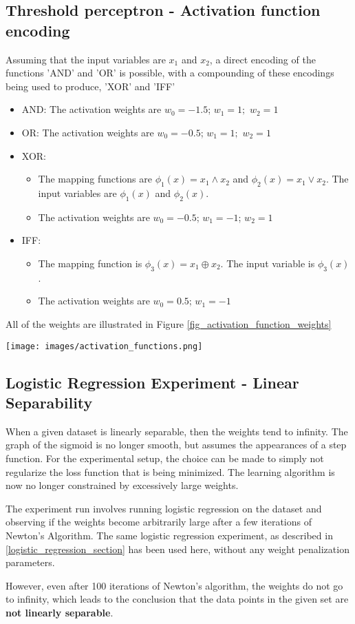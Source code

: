 \documentclass[a4paper]{article}
\begin{document}
\subsection{Threshold perceptron - Activation function encoding}
Assuming that the input variables are $x_1$ and $x_2$, a direct encoding of the functions 'AND' and 'OR' is possible, with a compounding of these encodings being used to produce, 'XOR' and 'IFF'
\begin{itemize}
	\item AND: The activation weights are $w_0 = -1.5$; $w_1 = 1;$ $w_2 = 1$
	\item OR: The activation weights are $w_0 = -0.5$; $w_1 = 1;$ $w_2 = 1$
	\item XOR: 
		\begin{itemize}
			\item The mapping functions are $\phi_1(x) = x_1 \land x_2$ and $\phi_2(x) = x_1 \lor x_2$. The input variables are $\phi_1(x)$ and $\phi_2(x)$.
			\item The activation weights are $w_0 = -0.5$; $w_1 = -1$; $w_2 = 1$
		\end{itemize}
	\item IFF: 
		\begin{itemize}
			\item The mapping function is $\phi_3(x) = x_1 \oplus x_2$. The input variable is $\phi_3(x)$.
			\item The activation weights are $w_0 = 0.5$; $w_1 = -1$
		\end{itemize}
\end{itemize}
All of the weights are illustrated in Figure \ref{fig_activation_function_weights}

\begin{figure*}[h]
    \centering
    \texttt{[image: images/activation\_functions.png]}
    \caption{Activation Function Weights}
    \label{fig_activation_function_weights}
\end{figure*}

\newpage

\subsection{Logistic Regression Experiment - Linear Separability}
When a given dataset is linearly separable, then the weights tend to infinity. The graph of the sigmoid is no longer smooth, but assumes the appearances of a step function.
For the experimental setup, the choice can be made to simply not regularize the loss function that is being minimized. The learning algorithm is now no longer constrained by excessively large weights. 

The experiment run involves running logistic regression on the dataset and observing if the weights become arbitrarily large after a few iterations of Newton's Algorithm. The same logistic regression experiment, as described in \ref{logistic_regression_section} has been used here, without any weight penalization parameters. 

However, even after 100 iterations of Newton's algorithm, the weights do not go to infinity, which leads to the conclusion that the data points in the given set are \textbf{not linearly separable}.
\end{document}

